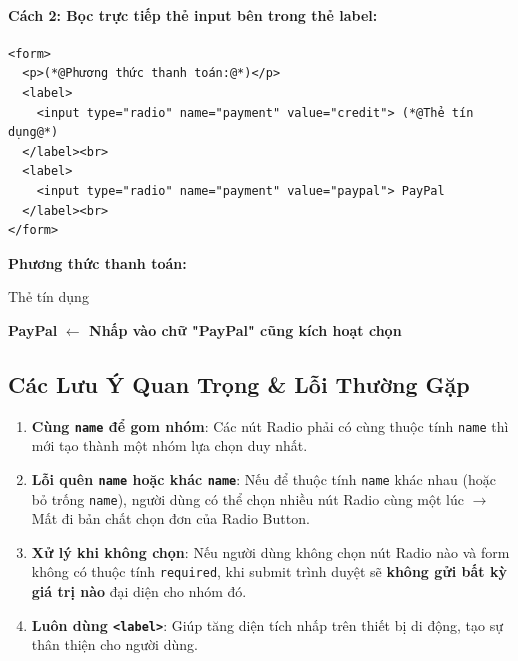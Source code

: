 \documentclass[11pt,oneside]{book}
\newcommand{\codeinline}[1]{\textcolor{accentOrange}{\texttt{#1}}}
\begin{document}
\paragraph{Cách 2: Bọc trực tiếp thẻ input bên trong thẻ label:}
\begin{codeWindow}
\begin{lstlisting}[language=HTML5]
<form>
  <p>(*@Phương thức thanh toán:@*)</p>
  <label>
    <input type="radio" name="payment" value="credit"> (*@Thẻ tín dụng@*)
  </label><br>
  <label>
    <input type="radio" name="payment" value="paypal"> PayPal
  </label><br>
</form>
\end{lstlisting}
\end{codeWindow}

\begin{browserWindow}
\sffamily\small
\textbf{Phương thức thanh toán:} \\[6pt]
 \; Thẻ tín dụng \\[4pt]
 \; \textbf{PayPal} \quad \textcolor{primaryBlue}{\small\textbf{$\leftarrow$ Nhấp vào chữ "PayPal" cũng kích hoạt chọn}}
\end{browserWindow}

\subsection{Các Lưu Ý Quan Trọng \& Lỗi Thường Gặp}

\begin{warnBox}
\begin{enumerate}[leftmargin=1.5em, itemsep=3pt, parsep=0pt]
    \item \textbf{Cùng \codeinline{name} để gom nhóm}: Các nút Radio phải có cùng thuộc tính \codeinline{name} thì mới tạo thành một nhóm lựa chọn duy nhất.
    \item \textbf{Lỗi quên \codeinline{name} hoặc khác \codeinline{name}}: Nếu để thuộc tính \codeinline{name} khác nhau (hoặc bỏ trống \codeinline{name}), người dùng có thể chọn nhiều nút Radio cùng một lúc $\rightarrow$ Mất đi bản chất chọn đơn của Radio Button.
    \item \textbf{Xử lý khi không chọn}: Nếu người dùng không chọn nút Radio nào và form không có thuộc tính \codeinline{required}, khi submit trình duyệt sẽ \textbf{không gửi bất kỳ giá trị nào} đại diện cho nhóm đó.
    \item \textbf{Luôn dùng \codeinline{<label>}}: Giúp tăng diện tích nhấp trên thiết bị di động, tạo sự thân thiện cho người dùng.
\end{enumerate}
\end{warnBox}
\end{document}
